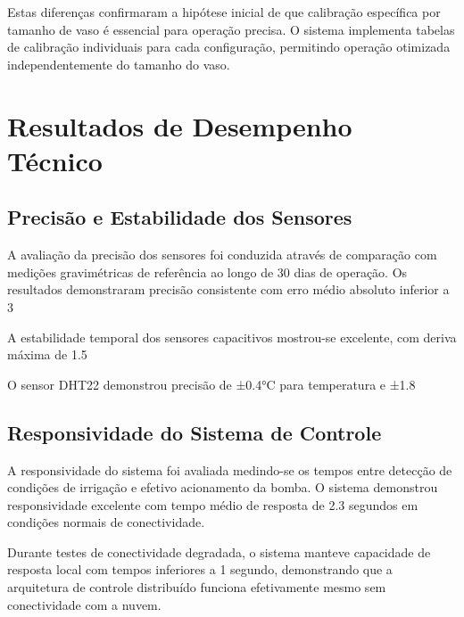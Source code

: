 Estas diferenças confirmaram a hipótese inicial de que calibração específica por tamanho de vaso é essencial para operação precisa. O sistema implementa tabelas de calibração individuais para cada configuração, permitindo operação otimizada independentemente do tamanho do vaso.

\section{Resultados de Desempenho Técnico}

\subsection{Precisão e Estabilidade dos Sensores}

A avaliação da precisão dos sensores foi conduzida através de comparação com medições gravimétricas de referência ao longo de 30 dias de operação. Os resultados demonstraram precisão consistente com erro médio absoluto inferior a 3%

A estabilidade temporal dos sensores capacitivos mostrou-se excelente, com deriva máxima de 1.5%

O sensor DHT22 demonstrou precisão de ±0.4°C para temperatura e ±1.8%

\subsection{Responsividade do Sistema de Controle}

A responsividade do sistema foi avaliada medindo-se os tempos entre detecção de condições de irrigação e efetivo acionamento da bomba. O sistema demonstrou responsividade excelente com tempo médio de resposta de 2.3 segundos em condições normais de conectividade.

Durante testes de conectividade degradada, o sistema manteve capacidade de resposta local com tempos inferiores a 1 segundo, demonstrando que a arquitetura de controle distribuído funciona efetivamente mesmo sem conectividade com a nuvem.

